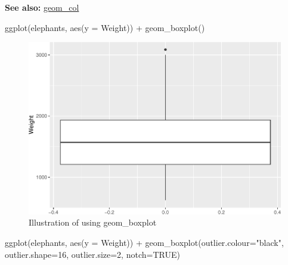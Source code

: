 \documentclass[
]{book}
\newenvironment{Shaded}{\begin{snugshade}}{\end{snugshade}}
\newcommand{\AttributeTok}[1]{\textcolor[rgb]{0.77,0.63,0.00}{#1}}
\newcommand{\ConstantTok}[1]{\textcolor[rgb]{0.00,0.00,0.00}{#1}}
\newcommand{\DecValTok}[1]{\textcolor[rgb]{0.00,0.00,0.81}{#1}}
\newcommand{\FunctionTok}[1]{\textcolor[rgb]{0.00,0.00,0.00}{#1}}
\newcommand{\NormalTok}[1]{#1}
\newcommand{\SpecialCharTok}[1]{\textcolor[rgb]{0.00,0.00,0.00}{#1}}
\newcommand{\StringTok}[1]{\textcolor[rgb]{0.31,0.60,0.02}{#1}}
\begin{document}
\textbf{See also: } \protect\hyperlink{col}{geom\_col}

\begin{Shaded}
\begin{Highlighting}[]
\FunctionTok{ggplot}\NormalTok{(elephants, }\FunctionTok{aes}\NormalTok{(}\AttributeTok{y =}\NormalTok{ Weight)) }\SpecialCharTok{+} 
  \FunctionTok{geom\_boxplot}\NormalTok{()}
\end{Highlighting}
\end{Shaded}

\begin{figure}
\centering
\includegraphics{Data-Visualisation-geom-Encyclopedia_files/figure-latex/unnamed-chunk-26-1.pdf}
\caption{\label{fig:unnamed-chunk-26}Illustration of using geom\_boxplot}
\end{figure}

\begin{Shaded}
\begin{Highlighting}[]
\FunctionTok{ggplot}\NormalTok{(elephants, }\FunctionTok{aes}\NormalTok{(}\AttributeTok{y =}\NormalTok{ Weight)) }\SpecialCharTok{+} 
\FunctionTok{geom\_boxplot}\NormalTok{(}\AttributeTok{outlier.colour=}\StringTok{"black"}\NormalTok{, }\AttributeTok{outlier.shape=}\DecValTok{16}\NormalTok{,}
             \AttributeTok{outlier.size=}\DecValTok{2}\NormalTok{, }\AttributeTok{notch=}\ConstantTok{TRUE}\NormalTok{)}
\end{Highlighting}
\end{Shaded}
\end{document}
